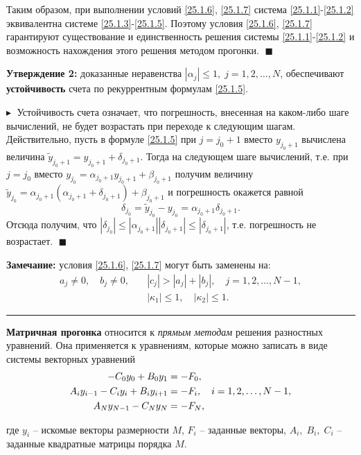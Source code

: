 Таким образом, при выполнении условий \eqref{25.1.6}, \eqref{25.1.7} система \eqref{25.1.1}-\eqref{25.1.2} эквивалентна системе \eqref{25.1.3}-\eqref{25.1.5}. Поэтому условия \eqref{25.1.6}, \eqref{25.1.7} гарантируют существование и единственность решения системы \eqref{25.1.1}-\eqref{25.1.2} и возможность нахождения этого решения методом прогонки. $\;\blacksquare$

\textbf{Утверждение 2:\;} доказанные неравенства $|\alpha_j| \leq 1, \; j = 1, 2, \ldots, N$, обеспечивают \textbf{устойчивость} счета по рекуррентным формулам \eqref{25.1.5}. 

$\blacktriangleright\;$ Устойчивость счета означает, что погрешность, внесенная на каком-либо шаге вычислений, не будет возрастать при переходе к следующим шагам. Действительно, пусть в формуле \eqref{25.1.5} при $j = j_0 + 1$ вместо $y_{j_0+1}$ вычислена величина $\widetilde{y}_{j_0+1} = y_{j_0+1} + \delta_{j_0+1}$. Тогда на следующем шаге вычислений, т.е. при $j = j_0$ вместо $y_{j_0} = \alpha_{j_0+1}y_{j_0+1} + \beta_{j_0+1}$ получим величину $\widetilde{y}_{j_0} = \alpha_{j_0+1}(\alpha_{j_0+1} + \delta_{j_0+1}) + \beta_{j_0+1}$ и погрешность окажется равной 
$$
\delta_{j_0} = \widetilde{y}_{j_0} - y_{j_0} = \alpha_{j_0+1}\delta_{j_0+1}.
$$
Отсюда получим, что $|\delta_{j_0}| \leq |\alpha_{j_0+1}| |\delta_{j_0+1}| \leq |\delta_{j_0+1}| $, т.е. погрешность не возрастает. $\;\blacksquare$

\textbf{Замечание:} условия \eqref{25.1.6}, \eqref{25.1.7} могут быть заменены на: 
\begin{align*} 
    a_j \ne 0, \quad b_j \ne 0,\quad &|c_j| > |a_j| + |b_j|, \quad j = 1, 2, \ldots, N-1,\\
    &|\kappa_1| \leq 1, \quad |\kappa_2| \leq 1.
\end{align*}

\rule{275pt}{0.5pt} 

\textbf{Матричная прогонка} относится к \textit{прямым методам} решения разностных уравнений. Она применяется к уравнениям, которые можно записать в виде системы векторных уравнений 
\begin{align}
    -C_0 y_0 + B_0 y_1 &= - F_0,\notag \\
    A_i y_{i-1} - C_i y_i + B_i y_{i+1} &= - F_i, \quad i = 1, 2, \ldots, N-1, \label{25.1}\\
    A_N y_{N-1} - C_N y_N &= - F_N,\notag
\end{align}

где $y_i$ -- искомые векторы размерности $M$, $F_i$ -- заданные векторы, $A_i, \; B_i, \; C_i$ -- заданные квадратные матрицы порядка $M$.

